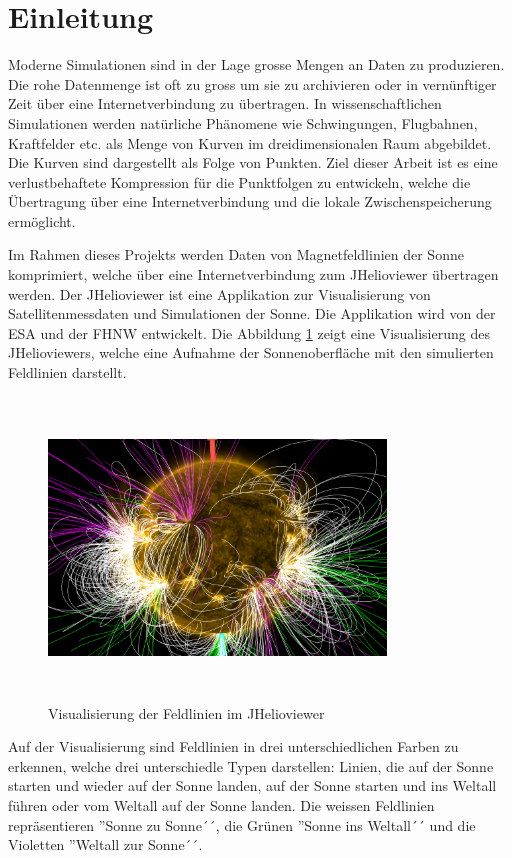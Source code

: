 \section{Einleitung}\label{einleitung}
Moderne Simulationen sind in der Lage grosse Mengen an Daten zu produzieren. Die rohe Datenmenge ist oft zu gross um sie zu archivieren oder in vernünftiger Zeit über eine Internetverbindung zu übertragen. In wissenschaftlichen Simulationen werden natürliche Phänomene wie Schwingungen, Flugbahnen, Kraftfelder etc. als Menge von Kurven im dreidimensionalen Raum abgebildet. Die Kurven sind dargestellt als Folge von Punkten. Ziel dieser Arbeit ist es eine verlustbehaftete Kompression für die Punktfolgen zu entwickeln, welche die Übertragung über eine Internetverbindung und die lokale Zwischenspeicherung ermöglicht.

Im Rahmen dieses Projekts werden Daten von Magnetfeldlinien der Sonne komprimiert, welche über eine Internetverbindung zum JHelioviewer übertragen werden. Der JHelioviewer ist eine Applikation zur Visualisierung von Satellitenmessdaten und Simulationen der Sonne. Die Applikation wird von der ESA und der FHNW entwickelt. Die Abbildung \ref{einleitung::feldlinien} zeigt eine Visualisierung des JHelioviewers, welche eine Aufnahme der Sonnenoberfläche mit den simulierten Feldlinien darstellt.

\begin{figure}[!htbp]
\center
	\includegraphics[width=0.8\textwidth,height=8cm,keepaspectratio]{./pictures/einleitung/fieldLines.png}
	\caption{Visualisierung der Feldlinien im JHelioviewer}
	\label{einleitung::feldlinien}
\end{figure}
Auf der Visualisierung sind Feldlinien in drei unterschiedlichen Farben zu erkennen, welche drei unterschiedle Typen darstellen: Linien, die auf der Sonne starten und wieder auf der Sonne landen, auf der Sonne starten und ins Weltall führen oder vom Weltall auf der Sonne landen. Die weissen Feldlinien repräsentieren ''Sonne zu Sonne´´, die Grünen ''Sonne ins Weltall´´ und die Violetten ''Weltall zur Sonne´´.

